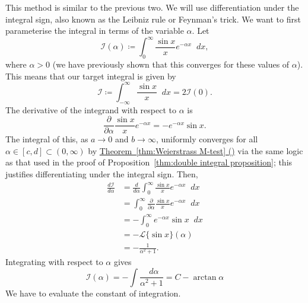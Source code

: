 \documentclass[a4paper]{article}
\newcommand*\diff{\mathop{}\!d} %
\theoremstyle{definition}
\begin{document}
This method is similar to the previous two.
We will use differentiation under the integral sign, also known as the Leibniz rule or Feynman's trick.
We want to first parameterise the integral in terms of the variable $\alpha$.
Let
\begin{equation*}
    \mathcal{I}(\alpha) \coloneq \int_{0}^{\infty} \frac{\sin x}{x} e^{- \alpha x} \diff x,
\end{equation*}
where $\alpha > 0$ (we have previously shown that this converges for these values of $\alpha$).
This means that our target integral is given by
\begin{equation*}
    \mathcal{I} \coloneq \int_{-\infty}^{\infty} \frac{\sin x}{x} \diff x = 2\mathcal{I}(0).
\end{equation*}
The derivative of the integrand with respect to $\alpha$ is
\begin{equation*}
    \frac{\partial}{\partial \alpha} \frac{\sin x}{x} e^{- \alpha x} = - e^{- \alpha x} \sin x.
\end{equation*}
The integral of this, as $a \to 0$ and $b \to \infty$,
uniformly converges for all $\alpha \in [c,d] \subset (0, \infty)$ by \hyperref[thm:Weierstrass M-test]{Theorem~\ref*{thm:Weierstrass M-test} ()} via the same logic as that used in the proof of Proposition~\ref{thm:double integral proposition}; this justifies differentiating under the integral sign.
Then,
\begin{align*}
    \frac{d\mathcal{I}}{d \alpha} & = \frac{d}{d \alpha} \int_{0}^{\infty} \frac{\sin x}{x} e^{- \alpha x} \diff x               \\
                                  & = \int_{0}^{\infty} \frac{\partial}{\partial \alpha} \frac{\sin x}{x} e^{- \alpha x} \diff x \\
                                  & = - \int_{0}^{\infty} e^{- \alpha x} \sin x  \diff x                                         \\
                                  & = - \mathscr{L} \{\sin x\}(\alpha)                                                           \\
                                  & = - \frac{1}{\alpha^2 + 1}.
\end{align*}
Integrating with respect to $\alpha$ gives
\begin{equation*}
    \mathcal{I}(\alpha) = - \int \frac{\diff \alpha}{\alpha^2 + 1} = C - \arctan \alpha
\end{equation*}
We have to evaluate the constant of integration.
\end{document}
